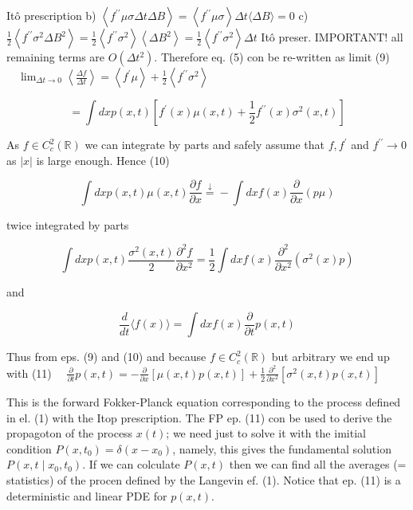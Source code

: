 Itô prescription
b) $\left\langle f^{\prime \prime} \mu \sigma \Delta t \Delta B\right\rangle=\left\langle f^{\prime \prime} \mu \sigma\right\rangle \Delta t\langle\Delta B\rangle=0$
c) $\frac{1}{2}\left\langle f^{\prime \prime} \sigma^{2} \Delta B^{2}\right\rangle=\frac{1}{2}\left\langle f^{\prime \prime} \sigma^{2}\right\rangle\left\langle\Delta B^{2}\right\rangle=\frac{1}{2}\left\langle f^{\prime \prime} \sigma^{2}\right\rangle \Delta t$ Itô preser. IMPORTANT!
all remaining terms are $O\left(\Delta t^{2}\right)$.
Therefore eq. (5) con be re-written as limit
(9) $\quad \lim _{\Delta t \rightarrow 0}\left\langle\frac{\Delta f}{\Delta t}\right\rangle=\left\langle f^{\prime} \mu\right\rangle+\frac{1}{2}\left\langle f^{\prime \prime} \sigma^{2}\right\rangle$

$$ =\int d x p(x, t)\left[f^{\prime}(x) \mu(x, t)+\frac{1}{2} f^{\prime \prime}(x) \sigma^{2}(x, t)\right] $$

As $f \in C_{c}^{2}(\mathbb{R})$ we can integrate by parts and safely assume that $f, f^{\prime}$ and $f^{\prime \prime} \rightarrow 0$ as $|x|$ is large enough. Hence
(10)

$$ \int d x p(x, t) \mu(x, t) \frac{\partial f}{\partial x} \stackrel{\downarrow}{=}-\int d x f(x) \frac{\partial}{\partial x}(p \mu) $$

twice integrated by parts

$$ \int d x p(x, t) \frac{\sigma^{2}(x, t)}{2} \frac{\partial^{2} f}{\partial x^{2}}=\frac{1}{2} \int d x f(x) \frac{\partial^{2}}{\partial x^{2}}\left(\sigma^{2}(x) p\right) $$

and

$$ \frac{d}{d t}\langle f(x)\rangle=\int d x f(x) \frac{\partial}{\partial t} p(x, t) $$

Thus from eps. (9) and (10) and because $f \in C_{c}^{2}(\mathbb{R})$ but arbitrary we end up with
(11) $\quad \frac{\partial}{\partial t} p(x, t)=-\frac{\partial}{\partial x}[\mu(x, t) p(x, t)]+\frac{1}{2} \frac{\partial^{2}}{\partial x^{2}}\left[\sigma^{2}(x, t) p(x, t)\right] $

This is the forward Fokker-Planck equation corresponding to the process defined in el. (1) with the Itop prescription. The FP ep. (11) con be used to derive the propagoton of the process $x(t)$; we need just to solve it with the imitial condition $P\left(x, t_{0}\right)=\delta\left(x-x_{0}\right)$, namely, this gives the fundamental solution $P\left(x, t \mid x_{0}, t_{0}\right)$. If we can colculate $P(x, t)$ then we can find all the averages (= statistics) of the procen defined by the Langevin ef. (1). Notice that ep. (11) is a deterministic and linear PDE for $p(x, t)$.

